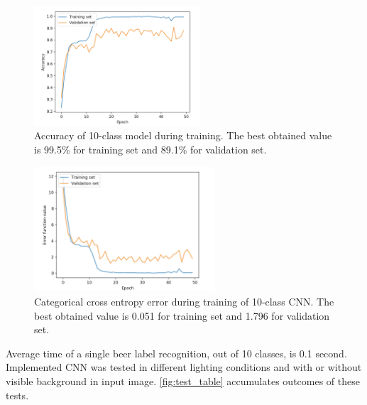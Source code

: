 \documentclass[11pt]{article}
\begin{document}
\begin{figure}[h]
\includegraphics[width=0.55\textwidth]{10_class_acc}
\centering
\caption{Accuracy of 10-class model during training. The best obtained value is 99.5\% for training set and 89.1\% for validation set.}
\label{fig:10_class_acc}
\end{figure}

\begin{figure}[h]
\includegraphics[width=0.6\textwidth]{10_class_err}
\centering
\caption{Categorical cross entropy error during training of 10-class CNN. The best obtained value is 0.051 for training set and 1.796 for validation set.}
\label{fig:10_class_err}
\end{figure}

Average time of a single beer label recognition, out of 10 classes, is 0.1 second. Implemented CNN was tested in different lighting conditions and with or without visible background in input image. \autoref{fig:test_table} accumulates outcomes of these tests.\\
\end{document}
